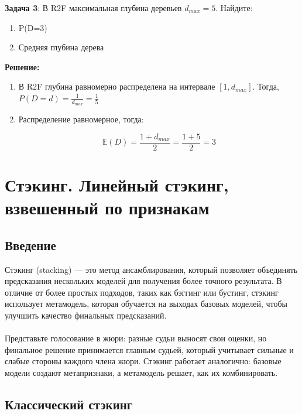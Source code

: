 \textbf{Задача 3}:
В R2F максимальная глубина деревьев $d_{max} = 5$. Найдите:
\begin{enumerate}
    \item P(D=3)
    \item Средняя глубина дерева
\end{enumerate}

\textbf{Решение:}
\begin{enumerate}
    \item 
    В R2F глубина равномерно распределена на интервале $[1, d_{max}]$.
    Тогда, $P(D=d) = \frac{1}{d_{max}} = \frac{1}{5}$

    \item 
    Распределение равномерное, тогда:

    $$\mathbb{E}(D) = \frac{1 + d_{max}}{2} = \frac{1 + 5}{2} = 3$$
\end{enumerate}


\section*{Стэкинг. Линейный стэкинг, взвешенный по признакам}

\subsection*{Введение}

Стэкинг (stacking) — это метод ансамблирования, который позволяет объединять предсказания нескольких моделей для получения более точного результата. В отличие от более простых подходов, таких как бэггинг или бустинг, стэкинг использует метамодель, которая обучается на выходах базовых моделей, чтобы улучшить качество финальных предсказаний.
\\
\\
Представьте голосование в жюри: разные судьи выносят свои оценки, но финальное решение принимается главным судьей, который учитывает сильные и слабые стороны каждого члена жюри. Стэкинг работает аналогично: базовые модели создают метапризнаки, а метамодель решает, как их комбинировать.

\subsection*{Классический стэкинг}


